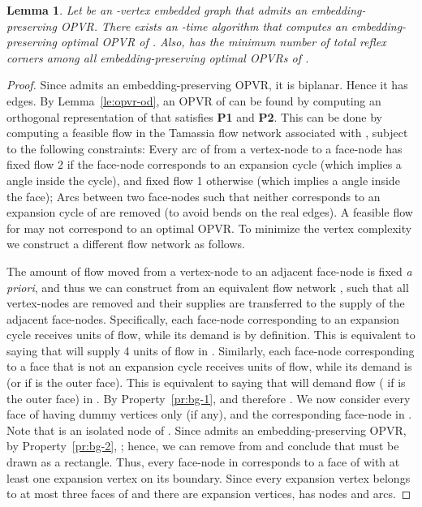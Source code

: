 \documentclass{article}
\newtheorem{lemma}{Lemma}
\newcommand{\opvr}{OPVR\xspace}
\begin{document}
\begin{lemma}\label{le:opt}
Let  be an -vertex embedded graph that admits an embedding-preserving \opvr. There exists an -time algorithm that computes an embedding-preserving optimal \opvr  of . Also,  has the minimum number of total reflex corners among all embedding-preserving optimal {\opvr}s of .
\end{lemma}
\begin{proof}
Since  admits an embedding-preserving \opvr, it is biplanar. Hence it has  edges.
By Lemma~\ref{le:opvr-od}, an \opvr of  can be found by computing an orthogonal representation of  that satisfies {\bf P1} and {\bf P2}. This can be done by computing a feasible flow in the Tamassia flow network  associated with , subject to the following constraints:  Every arc of  from a vertex-node to a face-node has fixed flow 2 if the face-node corresponds to an expansion cycle (which implies a  angle inside the cycle), and fixed flow 1 otherwise (which implies a  angle inside the face);  Arcs between two face-nodes such that neither corresponds to an expansion cycle of  are removed (to avoid bends on the real edges). A feasible flow for  may not correspond to an optimal \opvr. To minimize the vertex complexity we construct a different flow network as follows. 

The amount of flow moved from a vertex-node to an adjacent face-node is fixed \emph{a priori}, and thus we can construct from  an equivalent flow network , such that all vertex-nodes are removed and their supplies are transferred to the supply of the adjacent face-nodes. Specifically, each face-node  corresponding to an expansion cycle  receives  units of flow, while its demand is  by definition. This is equivalent to saying that  will supply 4 units of flow in . Similarly, each face-node  corresponding to a face  that is not an expansion cycle receives  units of flow, while its demand is  (or  if  is the outer face). This is equivalent to saying that  will demand flow  ( if  is the outer face) in . By Property~\ref{pr:bg-1},  and therefore . We now consider every face  of  having dummy vertices only (if any), and the corresponding face-node  in . Note that  is an isolated node of . Since  admits an embedding-preserving \opvr, by Property~\ref{pr:bg-2},  ; hence, we can remove  from  and conclude that  must be drawn as a rectangle. Thus, every face-node in  corresponds to a face of  with at least one expansion vertex on its boundary. Since every expansion vertex belongs to at most three faces of  and there are  expansion vertices,  has  nodes and arcs.  


\end{proof}
\end{document}

